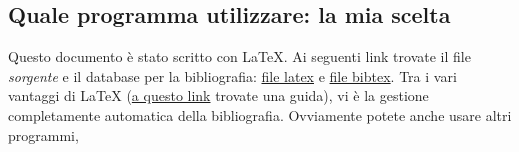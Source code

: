 \documentclass[12pt]{article}
\begin{document}
\subsection*{Quale programma utilizzare: la mia scelta}
Questo documento \`e stato scritto con \LaTeX. Ai seguenti link
trovate il file \textit{sorgente} e il database per la bibliografia:
\href{http://mgrazzi.github.io/guida-tesi.tex}{file latex} e
\href{http://mgrazzi.github.io/bib_file_esempio.bib}{file bibtex}. Tra
i vari vantaggi di \LaTeX
(\href{https://tobi.oetiker.ch/lshort/lshort.pdf}{a questo link}
trovate una guida), vi \`e la gestione completamente automatica della
bibliografia. Ovviamente potete anche usare altri programmi,



\end{document}
